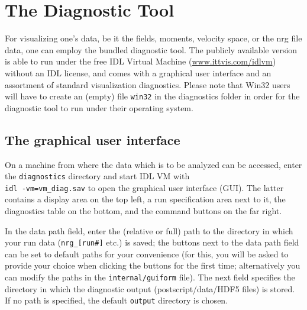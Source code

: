 \documentclass[12pt]{article}
\begin{document}


\newpage

\section{The Diagnostic Tool}
\label{sec:diag}

For visualizing one's \gene data, be it the fields, moments,
velocity space, or the nrg file data, one can employ the bundled
diagnostic tool. The publicly available version is able to run
under the free IDL Virtual Machine (\url{www.ittvis.com/idlvm})
without an IDL license, and comes with a graphical user interface and an
assortment of standard visualization diagnostics. Please note that
Win32 users will have to create an (empty) file \verb|win32| in
the diagnostics folder in order for the \gene diagnostic tool to
run under their operating system.

\subsection{The graphical user interface}

On a machine from where the data which is to be analyzed can be
accessed, enter the \verb|diagnostics| directory and start IDL VM with \\
{\tt idl -vm=vm\_diag.sav} to open the graphical user interface (GUI).
The latter contains a display area on the top left, a run
specification area next to it, the diagnostics table on the bottom,
and the command buttons on the far right.

In the data path field, enter the (relative or full) path
to the directory in which your run data (\verb|nrg_[run#]| etc.) is saved; the buttons next
to the data path field can be set to default paths for your
convenience (for this, you will be asked to provide your choice
when clicking the buttons for the first time; alternatively you
can modify the paths in the \verb|internal/guiform| file).
The next field specifies the directory in which the diagnostic output
(postscript/data/HDF5 files)
is stored. If no path is specified, the default \verb|output|
directory is chosen.
\end{document}
